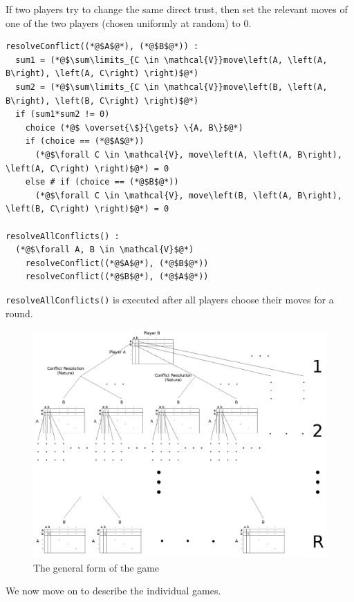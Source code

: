   If two players try to change the same direct trust, then set the relevant moves of one of the two players (chosen uniformly
  at random) to 0.
  \begin{lstlisting}[label=conflict, style=numbers]
resolveConflict((*@$A$@*), (*@$B$@*)) :
  sum1 = (*@$\sum\limits_{C \in \mathcal{V}}move\left(A, \left(A, B\right), \left(A, C\right) \right)$@*)
  sum2 = (*@$\sum\limits_{C \in \mathcal{V}}move\left(B, \left(A, B\right), \left(B, C\right) \right)$@*)
  if (sum1*sum2 != 0)
    choice (*@$ \overset{\$}{\gets} \{A, B\}$@*)
    if (choice == (*@$A$@*))
      (*@$\forall C \in \mathcal{V}, move\left(A, \left(A, B\right), \left(A, C\right) \right)$@*) = 0
    else # if (choice == (*@$B$@*))
      (*@$\forall C \in \mathcal{V}, move\left(B, \left(A, B\right), \left(B, C\right) \right)$@*) = 0

resolveAllConflicts() :
  (*@$\forall A, B \in \mathcal{V}$@*)
    resolveConflict((*@$A$@*), (*@$B$@*))
    resolveConflict((*@$B$@*), (*@$A$@*))
  \end{lstlisting}

  \noindent \texttt{resolveAllConflicts()} is executed after all players choose their moves for a round.

  \begin{figure}[h]
  \label{fig:game}
    \centering
    \includegraphics[width=\textwidth]{game}
    \caption{The general form of the game \cite{sgtm}}
  \end{figure}
  
  \noindent We now move on to describe the individual games.
